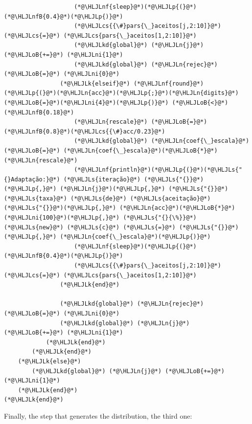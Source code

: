\documentclass[12pt,a4paper]{article}
\newcommand{\HLJLk}[1]{\textcolor[RGB]{148,91,176}{\textbf{#1}}}
\newcommand{\HLJLkd}[1]{\textcolor[RGB]{214,102,97}{\textit{#1}}}
\newcommand{\HLJLn}[1]{#1}
\newcommand{\HLJLnf}[1]{\textcolor[RGB]{66,102,213}{#1}}
\newcommand{\HLJLs}[1]{\textcolor[RGB]{201,61,57}{#1}}
\newcommand{\HLJLnfB}[1]{\textcolor[RGB]{59,151,46}{#1}}
\newcommand{\HLJLni}[1]{\textcolor[RGB]{59,151,46}{#1}}
\newcommand{\HLJLoB}[1]{\textcolor[RGB]{102,102,102}{\textbf{#1}}}
\newcommand{\HLJLp}[1]{#1}
\newcommand{\HLJLcs}[1]{\textcolor[RGB]{153,153,119}{\textit{#1}}}
\begin{document}
\begin{lstlisting}
                    (*@\HLJLnf{sleep}@*)(*@\HLJLp{(}@*)(*@\HLJLnfB{0.4}@*)(*@\HLJLp{)}@*)
                    (*@\HLJLcs{{\#}pars{\_}aceitos[j,2:10]}@*) (*@\HLJLcs{=}@*) (*@\HLJLcs{pars{\_}aceitos[1,2:10]}@*)
                    (*@\HLJLkd{global}@*) (*@\HLJLn{j}@*) (*@\HLJLoB{+=}@*) (*@\HLJLni{1}@*)
                    (*@\HLJLkd{global}@*) (*@\HLJLn{rejec}@*) (*@\HLJLoB{=}@*) (*@\HLJLni{0}@*)
                (*@\HLJLk{elseif}@*) (*@\HLJLnf{round}@*)(*@\HLJLp{(}@*)(*@\HLJLn{acc}@*)(*@\HLJLp{;}@*)(*@\HLJLn{digits}@*)(*@\HLJLoB{=}@*)(*@\HLJLni{4}@*)(*@\HLJLp{)}@*) (*@\HLJLoB{<}@*) (*@\HLJLnfB{0.18}@*)
                    (*@\HLJLn{rescale}@*) (*@\HLJLoB{=}@*) (*@\HLJLnfB{0.8}@*)(*@\HLJLcs{{\#}acc/0.23}@*)
                    (*@\HLJLkd{global}@*) (*@\HLJLn{coef{\_}escala}@*) (*@\HLJLoB{=}@*) (*@\HLJLn{coef{\_}escala}@*)(*@\HLJLoB{*}@*)(*@\HLJLn{rescale}@*)
                    (*@\HLJLnf{println}@*)(*@\HLJLp{(}@*)(*@\HLJLs{"{}Adaptação:}@*) (*@\HLJLs{iteração}@*) (*@\HLJLs{"{}}@*)(*@\HLJLp{,}@*) (*@\HLJLn{j}@*)(*@\HLJLp{,}@*) (*@\HLJLs{"{}}@*) (*@\HLJLs{taxa}@*) (*@\HLJLs{de}@*) (*@\HLJLs{aceitação}@*) (*@\HLJLs{"{}}@*)(*@\HLJLp{,}@*) (*@\HLJLn{acc}@*)(*@\HLJLoB{*}@*)(*@\HLJLni{100}@*)(*@\HLJLp{,}@*) (*@\HLJLs{"{}{\%}}@*) (*@\HLJLs{new}@*) (*@\HLJLs{c}@*) (*@\HLJLs{=}@*) (*@\HLJLs{"{}}@*)(*@\HLJLp{,}@*) (*@\HLJLn{coef{\_}escala}@*)(*@\HLJLp{)}@*)
                    (*@\HLJLnf{sleep}@*)(*@\HLJLp{(}@*)(*@\HLJLnfB{0.4}@*)(*@\HLJLp{)}@*)
                    (*@\HLJLcs{{\#}pars{\_}aceitos[j,2:10]}@*) (*@\HLJLcs{=}@*) (*@\HLJLcs{pars{\_}aceitos[1,2:10]}@*)
                (*@\HLJLk{end}@*)

                (*@\HLJLkd{global}@*) (*@\HLJLn{rejec}@*) (*@\HLJLoB{=}@*) (*@\HLJLni{0}@*)
                (*@\HLJLkd{global}@*) (*@\HLJLn{j}@*) (*@\HLJLoB{+=}@*) (*@\HLJLni{1}@*)
            (*@\HLJLk{end}@*)
        (*@\HLJLk{end}@*)
    (*@\HLJLk{else}@*)
        (*@\HLJLkd{global}@*) (*@\HLJLn{j}@*) (*@\HLJLoB{+=}@*) (*@\HLJLni{1}@*)
    (*@\HLJLk{end}@*)
(*@\HLJLk{end}@*)
\end{lstlisting}

Finally, the step that generates the distribution, the third one:
\end{document}
